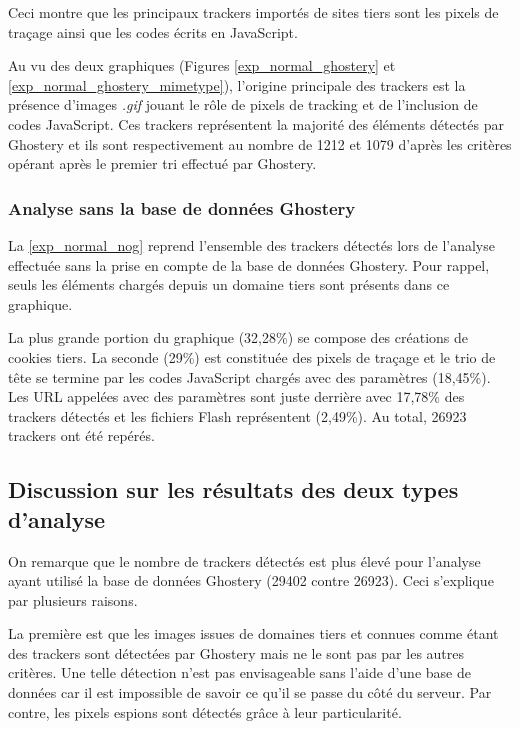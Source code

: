 Ceci montre que les principaux trackers importés de sites tiers sont les pixels de traçage ainsi que les codes écrits en JavaScript.

Au vu des deux graphiques (Figures \ref{exp_normal_ghostery} et \ref{exp_normal_ghostery_mimetype}), l'origine principale des trackers est la présence d'images \textit{.gif} jouant le rôle de pixels de tracking et de l'inclusion de codes JavaScript. Ces trackers représentent la majorité des éléments détectés par Ghostery et ils sont respectivement au nombre de 1212 et 1079 d'après les critères opérant après le premier tri effectué par Ghostery.

\subsubsection{Analyse sans la base de données Ghostery}
La \autoref{exp_normal_nog} reprend l'ensemble des trackers détectés lors de l'analyse effectuée sans la prise en compte de la base de données Ghostery. Pour rappel, seuls les éléments chargés depuis un domaine tiers sont présents dans ce graphique.

La plus grande portion du graphique (32,28\%) se compose des créations de cookies tiers. La seconde (29\%) est constituée des pixels de traçage et le trio de tête se termine par les codes JavaScript chargés avec des paramètres (18,45\%). Les URL appelées avec des paramètres sont juste derrière avec 17,78\% des trackers détectés et les fichiers Flash représentent (2,49\%). Au total, 26923 trackers ont été repérés.

\subsection{Discussion sur les résultats des deux types d'analyse}
\label{discussion_analyses}
On remarque que le nombre de trackers détectés est plus élevé pour l'analyse ayant utilisé la base de données Ghostery (29402 contre 26923).
Ceci s'explique par plusieurs raisons.
\newline

La première est que les images issues de domaines tiers et connues comme étant des trackers sont détectées par Ghostery mais ne le sont pas par les autres critères. Une telle détection n'est pas envisageable sans l'aide d'une base de données car il est impossible de savoir ce qu'il se passe du côté du serveur. Par contre, les pixels espions sont détectés grâce à leur particularité.
\newline
\newpage

